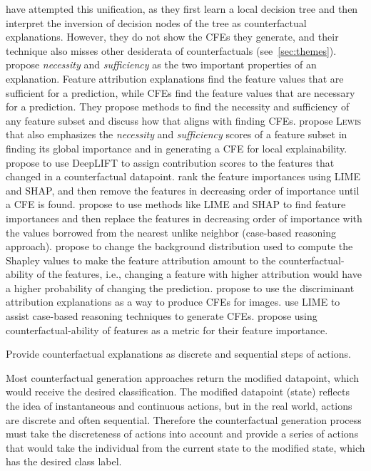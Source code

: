 \progress
\citet{guidotti_local_2018} have attempted this unification, as they first learn a local decision tree and then interpret the inversion of decision nodes of the tree as counterfactual explanations. However, they do not show the CFEs they generate, and their technique also misses other desiderata of counterfactuals (see~\cref{sec:themes}). 
\citet{unifying-cfe1-divyat} propose \textit{necessity} and \textit{sufficiency} as the two important properties of an explanation. Feature attribution explanations find the feature values that are sufficient for a prediction, while CFEs find the feature values that are necessary for a prediction. They propose methods to find the necessity and sufficiency of any feature subset and discuss how that aligns with finding CFEs. 
\citet{galhotra-sigmod-cfe} propose \textsc{Lewis} that also emphasizes the \textit{necessity} and \textit{sufficiency} scores of a feature subset in finding its global importance and in generating a CFE for local explainability. 
\citet{unifying-cfe2-deeplift} propose to use DeepLIFT to assign contribution scores to the features that changed in a counterfactual datapoint. 
\citet{ramon-cfe-comparison-text+behavior} rank the feature importances using LIME and SHAP, and then remove the features in decreasing order of importance until a CFE is found. 
\citet{DisCERN-use-shap-for-cfe} propose to use methods like LIME and SHAP to find feature importances and then replace the features in decreasing order of importance with the values borrowed from the nearest unlike neighbor (case-based reasoning approach). 
\citet{CF-Shap-paper} propose to change the background distribution used to compute the Shapley values to make the feature attribution amount to the counterfactual-ability of the features, i.e., changing a feature with higher attribution would have a higher probability of changing the prediction. 
\citet{SCOUT_cfe_images} propose to use the discriminant attribution explanations as a way to produce CFEs for images. 
\citet{student-moodle-cfe-cbr-technique} use LIME to assist case-based reasoning techniques to generate CFEs. 
\citet{use-cfe-instead-of-erasure} propose using counterfactual-ability of features as a metric for their feature importance. 


\begin{challenge}\label{ch:discrete}
Provide counterfactual explanations as discrete and sequential steps of actions. 
\end{challenge}
Most counterfactual generation approaches return the modified datapoint, which would receive the desired classification. 
The modified datapoint (state) reflects the idea of instantaneous and continuous actions, but in the real world, actions are discrete and often sequential. 
Therefore the counterfactual generation process must take the discreteness of actions into account and provide a series of actions that would take the individual from the current state to the modified state, which has the desired class label. 


